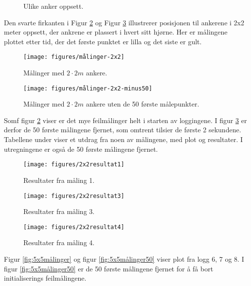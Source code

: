 \begin{figure}[htp]
    \centering
    \qquad
    \caption{Ulike anker oppsett.}%
    \label{fig:oppsett}%
\end{figure}

Den svarte firkanten i Figur \ref{fig:2x2målinger} og Figur \ref{fig:2x2målinger50} illustrerer 
posisjonen til ankerene i 2x2 meter oppsett, der ankrene er plassert i hvert sitt hjørne. 
Her er målingene plottet etter tid, der det første punktet er lilla og det siste er gult. 

\begin{figure}[htp]
\centering
\texttt{[image: figures/målinger-2x2]}
\caption{Målinger med $2\cdot2 m$ ankere.}
\label{fig:2x2målinger}
\end{figure}
\begin{figure}[htp]
\centering
\texttt{[image: figures/målinger-2x2-minus50]}
\caption{Målinger med $2\cdot2 m$ ankere uten de 50 første målepunkter.}
\label{fig:2x2målinger50}
\end{figure}

Somf figur \ref{fig:2x2målinger} viser er det mye feilmålinger helt i starten av loggingene. 
I figur \ref{fig:2x2målinger50} er derfor de 50 første målingene fjernet, som omtrent tilsier de første 2 sekundene. 
Tabellene under viser et utdrag fra noen av målingene, med plot og resultater. I utregningene er også de 50 første målingene fjernet.

\begin{figure}[htp]
\centering
\texttt{[image: figures/2x2resultat1]}
\caption{Resultater fra måling 1.}
\label{fig:2x2res1}
\end{figure}
\begin{figure}[htp]
\centering
\texttt{[image: figures/2x2resultat3]}
\caption{Resultater fra måling 3.}
\label{fig:2x2res3}
\end{figure}
\begin{figure}[htp]
\centering
\texttt{[image: figures/2x2resultat4]}
\caption{Resultater fra måling 4.}
\label{fig:2x2res4}
\end{figure}

Figur \ref{fig:5x5målinger} og figur \ref{fig:5x5målinger50} viser plot fra logg 6, 7 og 8. 
I figur \ref{fig:5x5målinger50} er de 50 første målingene fjernet for å få bort initialiserings feilmålingene. 

